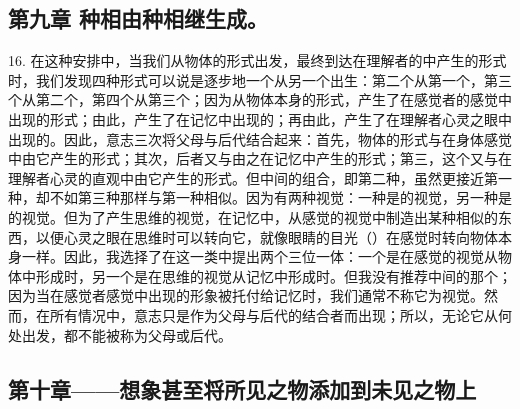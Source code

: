 
\subsection{第九章 种相由种相继生成。}

16. 在这种安排中，当我们从物体的形式出发，最终到达在理解者的中产生的形式时，我们发现四种形式可以说是逐步地一个从另一个出生：第二个从第一个，第三个从第二个，第四个从第三个；因为从物体本身的形式，产生了在感觉者的感觉中出现的形式；由此，产生了在记忆中出现的；再由此，产生了在理解者心灵之眼中出现的。因此，意志三次将父母与后代结合起来：首先，物体的形式与在身体感觉中由它产生的形式；其次，后者又与由之在记忆中产生的形式；第三，这个又与在理解者心灵的直观中由它产生的形式。但中间的组合，即第二种，虽然更接近第一种，却不如第三种那样与第一种相似。因为有两种视觉：一种是的视觉，另一种是的视觉。但为了产生思维的视觉，在记忆中，从感觉的视觉中制造出某种相似的东西，以便心灵之眼在思维时可以转向它，就像眼睛的目光（）在感觉时转向物体本身一样。因此，我选择了在这一类中提出两个三位一体：一个是在感觉的视觉从物体中形成时，另一个是在思维的视觉从记忆中形成时。但我没有推荐中间的那个；因为当在感觉者感觉中出现的形象被托付给记忆时，我们通常不称它为视觉。然而，在所有情况中，意志只是作为父母与后代的结合者而出现；所以，无论它从何处出发，都不能被称为父母或后代。\par


\subsection{第十章——想象甚至将所见之物添加到未见之物上}

